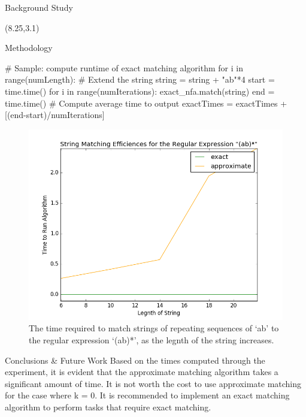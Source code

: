 \documentclass[22pt]{beamer}
\begin{document}
\begin{frame}[fragile]
\begin{textblock}{7.25}
\begin{block}{Background Study}
\end{block}
\end{textblock}


\begin{textblock}{7.25}(8.25,3.1)
\begin{block}{Methodology}

\begin{python}
  # Sample: compute runtime of exact matching algorithm
  for i in range(numLength):
      # Extend the string
      string = string + "ab"*4
      start = time.time()
      for i in range(numIterations):
          exact_nfa.match(string)    
      end = time.time()
      # Compute average time to output
      exactTimes = exactTimes + [(end-start)/numIterations]
\end{python}


\begin{figure}
\includegraphics[scale=1.9]{result_2.PNG}
\caption{The time required to match strings of repeating sequences of `ab' to the regular expression `(ab)*', as the legnth of the string increases.}
\end{figure}


\end{block}


\begin{block}{Conclusions \& Future Work}
Based on the times computed through the experiment, it is evident that the approximate matching algorithm takes a significant amount of time. It is not worth the cost to use approximate matching for the case where k = 0. It is recommended to implement an exact matching algorithm to perform tasks that require exact matching. 


\end{block}
\end{textblock}
\end{frame}
\end{document}
